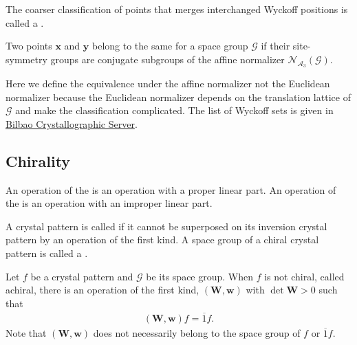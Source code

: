 
The coarser classification of points that merges interchanged Wyckoff positions is called a .
\begin{screen}
  \begin{defn}
    Two points $\bm{x}$ and $\bm{y}$ belong to the same  for a space group $\mathcal{G}$ if their site-symmetry groups are conjugate subgroups of the affine normalizer $\mathcal{N}_{\mathcal{A}_{3}}(\mathcal{G})$.
  \end{defn}
\end{screen}
Here we define the equivalence under the affine normalizer not the Euclidean normalizer because the Euclidean normalizer depends on the translation lattice of $\mathcal{G}$ and make the classification complicated.
The list of Wyckoff sets is given in \href{https://www.cryst.ehu.es/html/cryst/wyckoffsets.html}{Bilbao Crystallographic Server}.

%

\subsection{Chirality}

\begin{screen}
  \begin{defn}
    An operation of the  is an operation with a proper linear part.
    An operation of the  is an operation with an improper linear part.
  \end{defn}
\end{screen}

\begin{screen}
  \begin{defn}[chiral]
    A crystal pattern is called  if it cannot be superposed on its inversion crystal pattern by an operation of the first kind.
    A space group of a chiral crystal pattern is called a .
  \end{defn}
\end{screen}

Let $f$ be a crystal pattern and $\mathcal{G}$ be its space group.
When $f$ is not chiral, called achiral, there is an operation of the first kind, $(\bm{W}, \bm{w})$ with $\det \bm{W} > 0$ such that
\begin{align}
  \label{eq:chiral-crystal-patterns}
  (\bm{W}, \bm{w}) f = \overline{1} f.
\end{align}
Note that $(\bm{W}, \bm{w})$ does not necessarily belong to the space group of $f$ or $\overline{1}f$.

